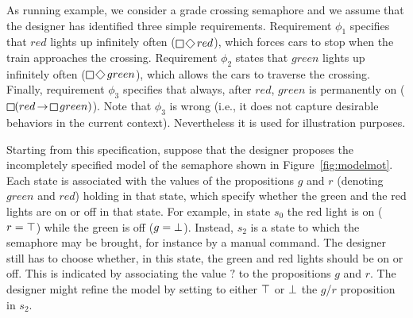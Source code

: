 As running example, we consider a grade crossing semaphore and we assume that the designer has identified three simple requirements.
Requirement $\phi_1$ specifies that $red$ lights up  infinitely often ($\LTLglobally\LTLfinally red$), which forces cars to stop when the train approaches the crossing.
Requirement $\phi_2$  states that $green$ lights up infinitely often ($\LTLglobally\LTLfinally green$), which allows the cars to traverse the crossing.
Finally, requirement $\phi_3$ specifies that always, after $red$, $green$ is permanently on ($\LTLglobally (red \LTLimplication \LTLglobally green)$).
Note that $\phi_3$ is wrong (i.e., it does not capture desirable behaviors in the current context). Nevertheless it is used for illustration purposes.

Starting from this specification, suppose that the designer proposes the incompletely specified model of the semaphore shown in Figure~\ref{fig:modelmot}. Each state is associated with the values of the propositions $g$ and $r$ (denoting $green$ and $red$) holding in that state, which specify whether the green and the red lights are on or off in that state.
For example, in state $s_0$ the red light is on ($r=\operatorname{\top}$) while the green is off ($g=\operatorname{\bot}$).
Instead,  $s_2$ is a state to which the semaphore may be brought, for instance by a manual command. 
The designer still has to choose whether, in this state, the green and red lights should be on or off.
This is indicated by associating the value $?$ to the propositions $g$ and $r$.
The designer might refine the model by setting to either $\operatorname{\top}$ or $\operatorname{\bot}$ the $g$/$r$ proposition in $s_2$.




